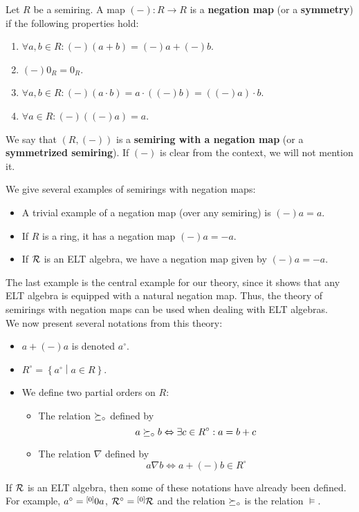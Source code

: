 \begin{defn}
Let $R$ be a semiring. A map $(-):R\to R$ is a \textbf{negation map} (or a \textbf{symmetry})
if the following properties hold:
\begin{enumerate}
\item $\forall a,b\in R:(-)\left(a+b\right)=(-)a+(-)b$.
\item $(-)0_R=0_R$.
\item $\forall a,b\in R:(-)\left(a\cdot b\right)=a\cdot\left((-)b\right)=\left((-)a\right)\cdot b$.
\item $\forall a\in R:(-)\left((-)a\right)=a$.
\end{enumerate}
We say that $\left(R,(-)\right)$ is a \textbf{semiring with a negation map} (or a \textbf{symmetrized semiring}). If $(-)$ is clear from the context, we will not mention it.
\end{defn}

We give several examples of semirings with negation maps:
\begin{itemize}
\item A trivial example of a negation map (over any semiring) is $(-)a=a$.
\item If $R$ is a ring, it has a negation map $(-)a=-a$.
\item If $\mathcal{R}$ is an ELT algebra, we have a negation map given by $(-)a=\minus a$.
\end{itemize}

The last example is the central example for our theory, since it shows that any ELT algebra is equipped with a natural negation map. Thus, the theory of semirings with negation maps can be used when dealing with ELT algebras.\\

We now present several notations from this theory:
\begin{itemize}
\item $a+(-)a$ is denoted $a^\circ$.
\item $R^\circ=\left\{a^\circ\middle|a\in R\right\}$.
\item We define two partial orders on $R$:
\begin{itemize}
\item The relation $\succeq_\circ$ defined by
$$a\succeq_\circ b\Leftrightarrow \exists c\in R^\circ:a=b+c$$
\item The relation $\nabla$ defined by
$$a\nabla b\Leftrightarrow a+(-)b\in R^\circ$$
\end{itemize}
\end{itemize}

If $\mathcal{R}$ is an ELT algebra, then some of these notations have already been defined. For example, $a^\circ=\overset{\left[0\right]}{}0 a$, $\mathcal{R}^\circ=\overset{\left[0\right]}{}\mathcal{R}$ and the relation $\succeq_\circ$ is the relation $\vDash$.
